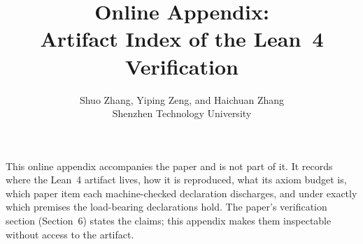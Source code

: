 \documentclass[11pt]{article}
\title{Online Appendix:\\ Artifact Index of the Lean~4 Verification}
\author{Shuo Zhang, Yiping Zeng, and Haichuan Zhang\\ Shenzhen Technology University}
\date{}
\newcommand{\pSecVerify}{6}      %
\begin{document}
\maketitle

\noindent This online appendix accompanies the paper and is not part of it. It records where the Lean~4 artifact lives,
how it is reproduced, what its axiom budget is, which paper item each machine-checked declaration discharges, and under
exactly which premises the load-bearing declarations hold. The paper's verification section (Section~\pSecVerify) states
the claims; this appendix makes them inspectable without access to the artifact.


\end{document}
